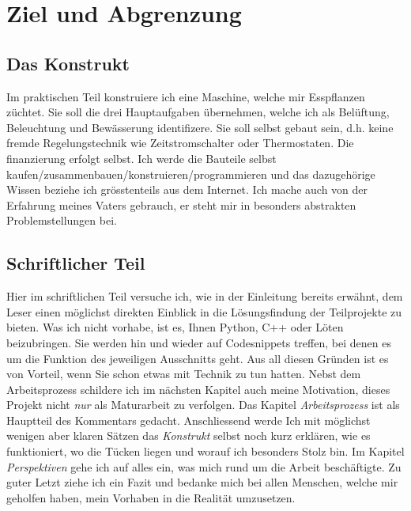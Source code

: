\documentclass[12pt,titlepage,a4paper]{article}
\begin{document}
\section{Ziel und Abgrenzung}
\subsection{Das Konstrukt}
Im praktischen Teil konstruiere ich eine Maschine, welche mir Esspflanzen züchtet. Sie soll die drei Hauptaufgaben übernehmen, welche ich als Belüftung, Beleuchtung und Bewässerung identifizere. Sie soll selbst gebaut sein, d.h. keine fremde Regelungstechnik wie Zeitstromschalter oder Thermostaten. Die finanzierung erfolgt selbst. Ich werde die Bauteile selbst kaufen/zusammenbauen/konstruieren/programmieren und das dazugehörige Wissen beziehe ich grösstenteils aus dem Internet. Ich mache auch von der Erfahrung meines Vaters gebrauch, er steht mir in besonders abstrakten Problemstellungen bei.
\subsection{Schriftlicher Teil}
Hier im schriftlichen Teil versuche ich, wie in der Einleitung bereits erwähnt, dem Leser einen möglichst direkten Einblick in die Lösungsfindung der Teilprojekte zu bieten. Was ich nicht vorhabe, ist es, Ihnen Python, C++ oder Löten beizubringen. Sie werden hin und wieder auf Codesnippets treffen, bei denen es um die Funktion des jeweiligen Ausschnitts geht. Aus all diesen Gründen ist es von Vorteil, wenn Sie schon etwas mit Technik zu tun hatten. Nebst dem Arbeitsprozess schildere ich im nächsten Kapitel auch meine Motivation, dieses Projekt nicht \textit{nur} als Maturarbeit zu verfolgen. Das Kapitel \textit{Arbeitsprozess} ist als Hauptteil des Kommentars gedacht. Anschliessend werde Ich mit möglichst wenigen aber klaren Sätzen das \textit{Konstrukt} selbst noch kurz erklären, wie es funktioniert, wo die Tücken liegen und worauf ich besonders Stolz bin. Im Kapitel \textit{Perspektiven} gehe ich auf alles ein, was mich rund um die Arbeit beschäftigte. Zu guter Letzt ziehe ich ein Fazit und bedanke mich bei allen Menschen, welche mir geholfen haben, mein Vorhaben in die Realität umzusetzen.
\end{document}
